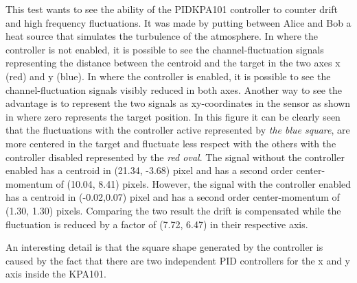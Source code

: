 This test wants to see the ability of the PIDKPA101 controller to counter drift and high frequency fluctuations.
It was made by putting between Alice and Bob a heat source that simulates the turbulence of the atmosphere.
In  where the controller is not enabled, it is possible to see the channel-fluctuation signals representing the distance between the centroid and the target in the two axes x (red) and y (blue).
In  where the controller is enabled, it is possible to see the channel-fluctuation signals visibly reduced in both axes.
Another way to see the advantage is to represent the two signals as xy-coordinates in the sensor as shown in  where zero represents the target position. In this figure it can be clearly seen that  the fluctuations with the controller active represented by \textit{the blue square}, are more centered in the target and fluctuate less respect with the others with the controller disabled represented by the \textit{red oval}.
The signal without the controller enabled has a centroid in (21.34, -3.68) pixel and has a second order center-momentum of (10.04, 8.41) pixels. However, the signal with the controller enabled has a centroid in (-0.02,0.07) pixel and has a second order center-momentum of (1.30, 1.30) pixels. Comparing the two result the drift is compensated while the fluctuation is reduced by a factor of (7.72, 6.47) in their respective axis.

An interesting detail is that the square shape generated by the controller is caused by the fact that there are two independent PID controllers for the x and y axis inside the KPA101.


